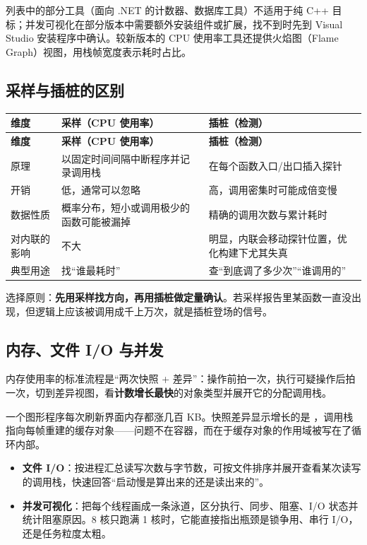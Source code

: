 \begin{warnbox}[注意]
列表中的部分工具（面向 .NET 的计数器、数据库工具）不适用于纯 C++ 目标；并发可视化在部分版本中需要额外安装组件或扩展，找不到时先到 Visual Studio 安装程序中确认。较新版本的 CPU 使用率工具还提供火焰图（Flame Graph）视图，用栈帧宽度表示耗时占比。
\end{warnbox}

\subsection{采样与插桩的区别}
\begin{longtable}{L{2.4cm}L{6.1cm}L{6.1cm}}
\toprule \textbf{维度} & \textbf{采样（CPU 使用率）} & \textbf{插桩（检测）} \\ \midrule
\endfirsthead
\toprule \textbf{维度} & \textbf{采样（CPU 使用率）} & \textbf{插桩（检测）} \\ \midrule
\endhead
\bottomrule \endlastfoot
原理 & 以固定时间间隔中断程序并记录调用栈 & 在每个函数入口/出口插入探针 \\
开销 & 低，通常可以忽略 & 高，调用密集时可能成倍变慢 \\
数据性质 & 概率分布，短小或调用极少的函数可能被漏掉 & 精确的调用次数与累计耗时 \\
对内联的影响 & 不大 & 明显，内联会移动探针位置，优化构建下尤其失真 \\
典型用途 & 找“谁最耗时” & 查“到底调了多少次”“谁调用的” \\
\end{longtable}

选择原则：\textbf{先用采样找方向，再用插桩做定量确认}。若采样报告里某函数一直没出现，但逻辑上应该被调用成千上万次，就是插桩登场的信号。

\subsection{内存、文件 I/O 与并发}
内存使用率的标准流程是“两次快照 + 差异”：操作前拍一次，执行可疑操作后拍一次，切到差异视图，看\textbf{计数增长最快}的对象类型并展开它的分配调用栈。

\begin{keybox}[实战场景]
一个图形程序每次刷新界面内存都涨几百 KB。快照差异显示增长的是 ，调用栈指向每帧重建的缓存对象——问题不在容器，而在于缓存对象的作用域被写在了循环内部。
\end{keybox}

\begin{itemize}
  \item \textbf{文件 I/O}：按进程汇总读写次数与字节数，可按文件排序并展开查看某次读写的调用栈，快速回答“启动慢是算出来的还是读出来的”。
  \item \textbf{并发可视化}：把每个线程画成一条泳道，区分执行、同步、阻塞、I/O 状态并统计阻塞原因。8 核只跑满 1 核时，它能直接指出瓶颈是锁争用、串行 I/O，还是任务粒度太粗。
\end{itemize}

